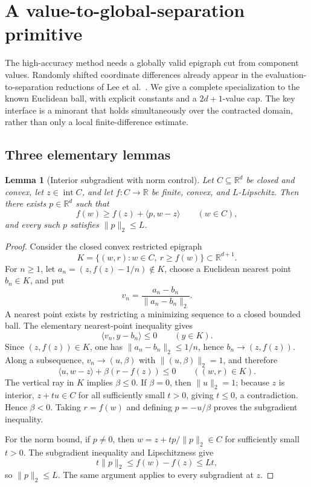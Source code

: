 \documentclass[11pt]{article}
\numberwithin{equation}{section}
\newtheorem{lemma}[lemma]{Lemma}
\theoremstyle{remark}
\theoremstyle{definition}
\newcommand{\R}{\mathbb{R}}
\newcommand{\ip}[2]{\langle #1,#2\rangle}
\newcommand{\norm}[1]{\lVert #1\rVert_2}
\begin{document}
\section{A value-to-global-separation primitive}
\label{sec:separator}

The high-accuracy method needs a globally valid epigraph cut from
component values. Randomly shifted coordinate differences already
appear in the evaluation-to-separation reductions of
Lee et al.~\cite[Section 3.1, Algorithm 2 and Lemmas 9--10]{lsv2018}.
We give a complete specialization to the known Euclidean ball, with
explicit constants and a $2d+1$-value cap. The key interface is a
minorant that holds simultaneously over the contracted domain, rather
than only a local finite-difference estimate.

\subsection{Three elementary lemmas}

\begin{lemma}[Interior subgradient with norm control]
\label{lem:interior-subgradient}
Let $C\subseteq\R^d$ be closed and convex, let $z\in\operatorname{int}C$, and let $f:C\to\R$ be finite, convex, and $L$-Lipschitz.  Then there exists $p\in\R^d$ such that
\[
f(w)\ge f(z)+\ip{p}{w-z}\qquad(w\in C),
\]
and every such $p$ satisfies $\norm p\le L$.
\end{lemma}

\begin{proof}
Consider the closed convex restricted epigraph
\[
K=\{(w,r):w\in C,\ r\ge f(w)\}\subset\R^{d+1}.
\]
For $n\ge1$, let $a_n=(z,f(z)-1/n)\notin K$, choose a Euclidean nearest point $b_n\in K$, and put
\[
v_n=\frac{a_n-b_n}{\norm{a_n-b_n}}.
\]
A nearest point exists by restricting a minimizing sequence to a closed bounded ball.  The elementary nearest-point inequality gives
\[
\ip{v_n}{y-b_n}\le0\qquad(y\in K).
\]
Since $(z,f(z))\in K$, one has $\norm{a_n-b_n}\le1/n$, hence $b_n\to(z,f(z))$.  Along a subsequence, $v_n\to(u,\beta)$ with $\norm{(u,\beta)}=1$, and therefore
\[
\ip{u}{w-z}+\beta(r-f(z))\le0\qquad((w,r)\in K).
\]
The vertical ray in $K$ implies $\beta\le0$.  If $\beta=0$, then $\norm u=1$; because $z$ is interior, $z+tu\in C$ for all sufficiently small $t>0$, giving $t\le0$, a contradiction.  Hence $\beta<0$.  Taking $r=f(w)$ and defining $p=-u/\beta$ proves the subgradient inequality.

For the norm bound, if $p\ne0$, then $w=z+t p/\norm p\in C$ for sufficiently small $t>0$.  The subgradient inequality and Lipschitzness give
\[
t\norm p\le f(w)-f(z)\le Lt,
\]
so $\norm p\le L$.  The same argument applies to every subgradient at $z$.
\end{proof}
\end{document}
